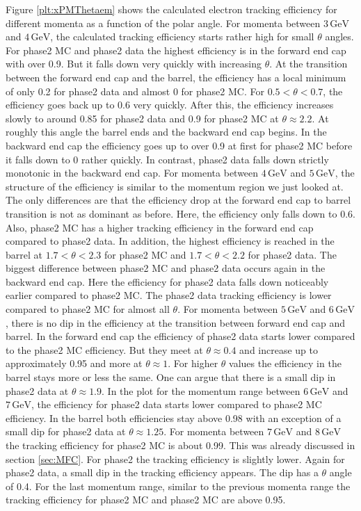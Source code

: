 \documentclass[a4paper,11pt,twosided,final,german,openbib,pdftex,listof=totoc,bibliography=totoc]{scrbook}
\begin{document}
Figure \ref{plt:xPMThetaem} shows the calculated electron tracking efficiency for different momenta as a function of the polar angle. For momenta between $3\,\textrm{GeV}$ and $4\,\textrm{GeV}$, the calculated tracking efficiency starts rather high for small $\theta$ angles. For phase2 MC and phase2 data the highest efficiency is in the forward end cap with over 0.9. But it falls down very quickly with increasing $\theta$. At the transition between the forward end cap and the barrel, the efficiency has a local minimum of only 0.2 for phase2 data and almost 0 for phase2 MC.
For $0.5 < \theta < 0.7$, the efficiency goes back up to 0.6 very quickly. After this, the efficiency increases slowly to around 0.85 for phase2 data and 0.9 for phase2 MC at $\theta \approx 2.2$. At roughly  this angle the barrel ends and the backward end cap begins. 
In the backward end cap the efficiency goes up to over 0.9 at first for phase2 MC before it falls down to 0 rather quickly. In contrast, phase2 data falls down strictly monotonic in the backward end cap. 
For momenta between $4\,\textrm{GeV}$ and $5\,\textrm{GeV}$, the structure of the efficiency is similar to the momentum region we just looked at. The only differences are that the efficiency drop at the forward end cap to barrel transition is not as dominant as before. Here, the efficiency only falls down to 0.6. Also, phase2 MC has a higher tracking efficiency in the forward end cap compared to phase2 data.
In addition, the highest efficiency is reached in the barrel at $1.7< \theta <2.3$ for phase2 MC and $1.7< \theta <2.2$ for phase2 data. The biggest difference between phase2 MC and phase2 data occurs again in the backward end cap. Here the efficiency for phase2 data falls down noticeably earlier compared to phase2 MC. The phase2 data tracking efficiency is lower compared to phase2 MC for almost all $\theta$.
For momenta between $5\,\textrm{GeV}$ and $6\,\textrm{GeV}$, there is no dip in the efficiency at the transition between forward end cap and barrel. In the forward end cap the efficiency of phase2 data starts lower compared to the phase2 MC efficiency. But they meet at $\theta \approx 0.4$  and increase up to approximately 0.95 and more at $\theta \approx 1$.
For higher $\theta$ values the efficiency in the barrel stays more or less the same. One can argue that there is a small dip in phase2 data at $\theta \approx 1.9$.
In the plot for the momentum range between $6\,\textrm{GeV}$ and $7\,\textrm{GeV}$, the efficiency for phase2 data starts lower compared to phase2 MC efficiency. In the barrel both efficiencies stay above 0.98 with an exception of a small dip for phase2 data at $\theta \approx 1.25$. For momenta  between $7\,\textrm{GeV}$ and $8\,\textrm{GeV}$ the tracking efficiency for phase2 MC is about 0.99. This was already discussed in section \ref{sec:MFC}. For phase2 the tracking efficiency is slightly lower. Again for phase2 data, a small dip in the tracking efficiency appears. The dip has a $\theta$ angle of 0.4. For the last momentum range, similar to the previous momenta range the tracking efficiency for phase2 MC and phase2 MC are above 0.95.
 
\end{document}
